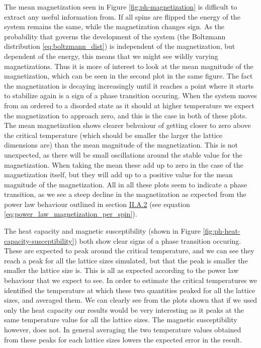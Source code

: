 \documentclass[reprint,english,notitlepage]{revtex4-1}  %
\begin{document}
The mean magnetization seen in Figure \ref{fig:ph-magnetization} is difficult to extract any useful information from. If all spins are flipped the energy of the system remains the same, while the magnetization changes sign. As the probability that governs the development of the system (the Boltzmann distribution \eqref{eq:boltzmann_dist}) is independent of the magnetization, but dependent of the energy, this means that we might see wildly varying magnetizations. Thus it is more of interest to look at the mean magnitude of the magnetization, which can be seen in the second plot in the same figure. The fact the magnetization is decaying increasingly until it reaches a point where it starts to stabilize again is a sign of a phase transition occuring. When the system moves from an ordered to a disorded state as it should at higher temperature we expect the magnetization to approach zero, and this is the case in both of these plots. The mean magnetization shows clearer behvaiour of getting closer to zero above the critical temperature (which should be smaller the larger the lattice dimensions are) than the mean magnitude of the magnetization. This is not unexpected, as there will be small oscillations around the stable value for the magnetization. When taking the mean these add up to zero in the case of the magnetization itself, but they will add up to a positive value for the mean magnitude of the magnetization. All in all these plots seem to indicate a phase transition, as we see a steep decline in the magnetization as expected from the power law behaviour outlined in section \hyperref[sec:II:A:ii]{II.A.2} (see equation \eqref{eq:power_law_magnetization_per_spin}). 

The heat capacity and magnetic susceptibility (shown in Figure \ref{fig:ph-heat-capacity-susceptibility}) both show clear signs of a phase transition  occuring. These are expected to peak around the critical temperature, and we can see they reach a peak for all the lattice sizes simulated, but that the peak is smaller the smaller the lattice size is. This is all as expected according to the power law behaviour that we expect to see. In order to estimate the critical temperatures we identified the temperature at which these two quantities peaked for all the lattice sizes, and averaged them. We can clearly see from the plots shown that if we used only the heat capacity our results would be very interesting as it peaks at the same temperature value for all the lattice sizes. The magnetic susceptibility however, does not. In general averaging the two temperature values obtained from these peaks for each lattice sizes lowers the expected error in the result. 
\end{document}

